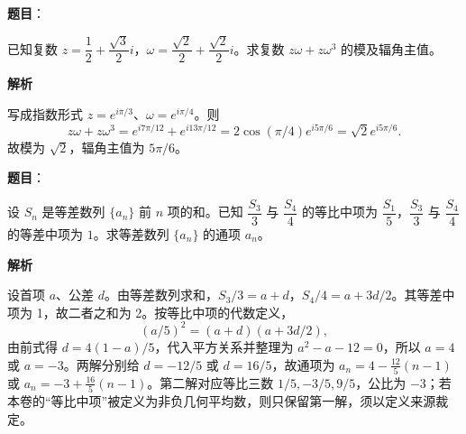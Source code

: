 \begin{answer}

\textbf{题目}：

已知复数 $z=\dfrac12+\dfrac{\sqrt3}{2}i$，$\omega=\dfrac{\sqrt2}{2}+\dfrac{\sqrt2}{2}i$。求复数 $z\omega+z\omega^3$ 的模及辐角主值。

\textbf{解析}

写成指数形式 $z=e^{i\pi/3}$、$\omega=e^{i\pi/4}$。则
\nopagebreak[4]
\[
z\omega+z\omega^3=e^{i7\pi/12}+e^{i13\pi/12}=2\cos(\pi/4)e^{i5\pi/6}=\sqrt2e^{i5\pi/6}.
\]
故模为 $\sqrt2$，辐角主值为 $5\pi/6$。


\end{answer}
\begin{answer}

\textbf{题目}：

设 $S_n$ 是等差数列 $\{a_n\}$ 前 $n$ 项的和。已知 $\dfrac{S_3}{3}$ 与 $\dfrac{S_4}{4}$ 的等比中项为 $\dfrac{S_1}{5}$，$\dfrac{S_3}{3}$ 与 $\dfrac{S_4}{4}$ 的等差中项为 $1$。求等差数列 $\{a_n\}$ 的通项 $a_n$。

\textbf{解析}

设首项 $a$、公差 $d$。由等差数列求和，$S_3/3=a+d$，$S_4/4=a+3d/2$。其等差中项为 1，故二者之和为 2。按等比中项的代数定义，
\nopagebreak[4]
\[
(a/5)^2=(a+d)(a+3d/2),
\]
由前式得 $d=4(1-a)/5$，代入平方关系并整理为 $a^2-a-12=0$，所以 $a=4$ 或 $a=-3$。两解分别给 $d=-12/5$ 或 $d=16/5$，故通项为 $a_n=4-\frac{12}{5}(n-1)$ 或 $a_n=-3+\frac{16}{5}(n-1)$。第二解对应等比三数 $1/5,-3/5,9/5$，公比为 $-3$；若本卷的“等比中项”被定义为非负几何平均数，则只保留第一解，须以定义来源裁定。


\end{answer}
